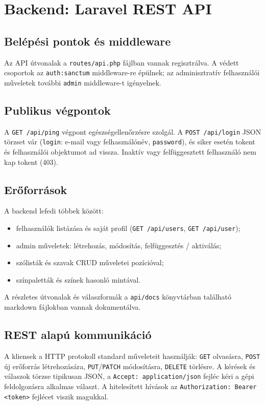 \documentclass[12pt,a4paper,openany]{book}
\begin{document}
\chapter{Backend: Laravel REST API}
\label{ch:api}

\section{Belépési pontok és middleware}
Az API útvonalak a \texttt{routes/api.php} fájlban vannak regisztrálva. A védett csoportok az \texttt{auth:sanctum} middleware-re épülnek; az adminisztratív felhasználói műveletek további \texttt{admin} middleware-t igényelnek.

\section{Publikus végpontok}
A \texttt{GET /api/ping} végpont egészségellenőrzésre szolgál. A \texttt{POST /api/login} JSON törzset vár (\texttt{login}: e-mail vagy felhasználónév, \texttt{password}), és siker esetén tokent és felhasználói objektumot ad vissza. Inaktív vagy felfüggesztett felhasználó nem kap tokent (403).

\section{Erőforrások}
A backend lefedi többek között:
\begin{itemize}
  \item felhasználók listázása és saját profil (\texttt{GET /api/users}, \texttt{GET /api/user});
  \item admin műveletek: létrehozás, módosítás, felfüggesztés / aktiválás;
  \item szólisták és szavak CRUD műveletei pozícióval;
  \item színpaletták és színek hasonló mintával.
\end{itemize}
A részletes útvonalak és válaszformák a \texttt{api/docs} könyvtárban található markdown fájlokban vannak dokumentálva.

\section{REST alapú kommunikáció}
A kliensek a HTTP protokoll standard műveleteit használják: \texttt{GET} olvasásra, \texttt{POST} új erőforrás létrehozására, \texttt{PUT}/\texttt{PATCH} módosításra, \texttt{DELETE} törlésre. A kérések és válaszok törzse tipikusan JSON, a \texttt{Accept: application/json} fejléc kéri a gépi feldolgozásra alkalmas választ. A hitelesített hívások az \texttt{Authorization: Bearer <token>} fejlécet viszik magukkal.
\end{document}
